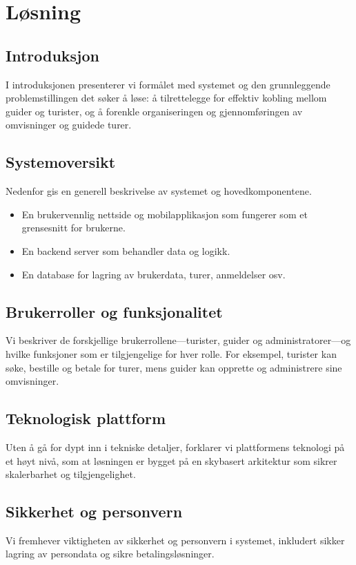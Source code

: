 \documentclass[../doc.tex]{subfiles}
\begin{document}
\section{Løsning}
\subsection{Introduksjon}
I introduksjonen presenterer vi formålet med systemet og den grunnleggende problemstillingen det søker å løse: å tilrettelegge for effektiv kobling mellom guider og turister, og å forenkle organiseringen og gjennomføringen av omvisninger og guidede turer.

\subsection{Systemoversikt}
Nedenfor gis en generell beskrivelse av systemet og hovedkomponentene.

\begin{itemize}
    \item 
    En brukervennlig nettside og mobilapplikasjon som fungerer som et grensesnitt for brukerne.
    \item 
    En backend server som behandler data og logikk.
    \item
    En database for lagring av brukerdata, turer, anmeldelser osv.
\end{itemize}

\subsection{Brukerroller og funksjonalitet}
Vi beskriver de forskjellige brukerrollene---turister, guider og administratorer---og hvilke funksjoner som er tilgjengelige for hver rolle. For eksempel, turister kan søke, bestille og betale for turer, mens guider kan opprette og administrere sine omvisninger.

\subsection{Teknologisk plattform}
Uten å gå for dypt inn i tekniske detaljer, forklarer vi plattformens teknologi på et høyt nivå, som at løsningen er bygget på en skybasert arkitektur som sikrer skalerbarhet og tilgjengelighet.

\subsection{Sikkerhet og personvern}
Vi fremhever viktigheten av sikkerhet og personvern i systemet, inkludert sikker lagring av persondata og sikre betalingsløsninger.
\end{document}
